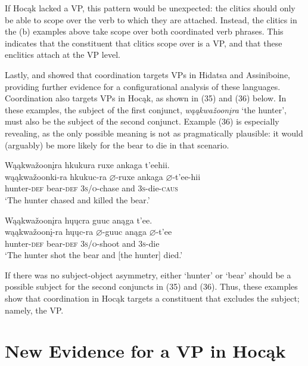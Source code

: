 \documentclass[output=paper]{LSP/langsci}
\begin{document}
If Hocąk lacked a VP, this pattern would be unexpected: the clitics should only be able to scope over the verb to which they are attached. Instead, the clitics in the (b) examples above take scope over both coordinated verb phrases. This indicates that the constituent that clitics scope over is a VP, and that these enclitics attach at the VP level. 
	
Lastly, \citet{Boyle2007} and \citet{West2003} showed that coordination targets VPs in Hidatsa and Assiniboine, providing further evidence for a configurational analysis of these languages.  Coordination also targets VPs in Hocąk, as shown in (35) and (36) below. In these examples, the subject of the first conjunct, \textit{wąąkwa\v{z}oon\k{i}ra} `the hunter', must also be the subject of the second conjunct.  Example (36) is especially revealing, as the only possible meaning is not as pragmatically plausible: it would (arguably) be more likely for the bear to die in that scenario.

\begin{exe}
\ex 
\glll Wąąkwa\v{z}oon\k{i}ra 		hk{u}k{u}ra 			ruxe 				ank{a}ga 	t'eehii. \\
wąąkwa\v{z}oonk{i}-ra 	hk{u}k{u}c-ra 		$\varnothing$-ruxe  		ank{a}ga 	$\varnothing$-t'ee-hii \\
hunter-\textsc{def} 					bear-\textsc{def} 	\textsc{3s/o}-chase and 		\textsc{3s}-die-\textsc{caus} \\
\trans`The hunter chased and killed the bear.'

\ex 
\glll Wąąkwa\v{z}oon\k{i}ra 		h\k{u}\k{u}cra 		guuc 				anąga 	t'ee. \\
wąąkwa\v{z}oon\k{i}-ra 	h\k{u}\k{u}c-ra 		$\varnothing$-guuc 			anąga 	$\varnothing$-t'ee \\
hunter-\textsc{def} 		bear-\textsc{def} 	\textsc{3s/o}-shoot 		and 		\textsc{3s}-die \\
\trans `The hunter shot the bear and [the hunter] died.'
\end{exe}
	
If there was no subject-object asymmetry, either `hunter' or `bear' should be a possible subject for the second conjuncts in (35) and (36). Thus, these examples show that coordination in Hocąk targets a constituent that excludes the subject; namely, the VP.

\section{New Evidence for a VP in Hocąk}
\end{document}
